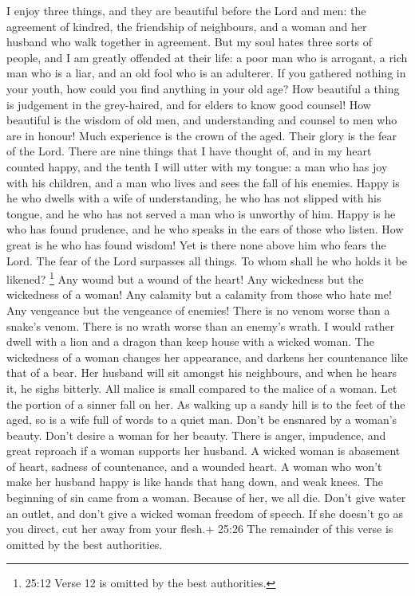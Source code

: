  I enjoy three things, and they are beautiful before the
Lord and men: the agreement of kindred, the friendship of neighbours,
and a woman and her husband who walk together in agreement. 
But my soul hates three sorts of people, and I am greatly offended at
their life: a poor man who is arrogant, a rich man who is a liar, and an
old fool who is an adulterer.  If you gathered nothing in
your youth, how could you find anything in your old age? 
How beautiful a thing is judgement in the grey-haired, and for elders to
know good counsel!  How beautiful is the wisdom of old men,
and understanding and counsel to men who are in honour! 
Much experience is the crown of the aged. Their glory is the fear of the
Lord.  There are nine things that I have thought of, and in
my heart counted happy, and the tenth I will utter with my tongue: a man
who has joy with his children, and a man who lives and sees the fall of
his enemies.  Happy is he who dwells with a wife of
understanding, he who has not slipped with his tongue, and he who has
not served a man who is unworthy of him.  Happy is he who
has found prudence, and he who speaks in the ears of those who listen.
 How great is he who has found wisdom! Yet is there none
above him who fears the Lord.  The fear of the Lord
surpasses all things. To whom shall he who holds it be likened?
 \footnote{25:12 Verse 12 is omitted by the best
  authorities.}  Any wound but a wound of the heart! Any
wickedness but the wickedness of a woman!  Any calamity but
a calamity from those who hate me! Any vengeance but the vengeance of
enemies!  There is no venom worse than a snake's venom.
There is no wrath worse than an enemy's wrath.  I would
rather dwell with a lion and a dragon than keep house with a wicked
woman.  The wickedness of a woman changes her appearance,
and darkens her countenance like that of a bear.  Her
husband will sit amongst his neighbours, and when he hears it, he sighs
bitterly.  All malice is small compared to the malice of a
woman. Let the portion of a sinner fall on her.  As walking
up a sandy hill is to the feet of the aged, so is a wife full of words
to a quiet man.  Don't be ensnared by a woman's beauty.
Don't desire a woman for her beauty.  There is anger,
impudence, and great reproach if a woman supports her husband.
 A wicked woman is abasement of heart, sadness of
countenance, and a wounded heart. A woman who won't make her husband
happy is like hands that hang down, and weak knees.  The
beginning of sin came from a woman. Because of her, we all die.
 Don't give water an outlet, and don't give a wicked woman
freedom of speech.  If she doesn't go as you direct, cut
her away from your flesh.+ 25:26 The remainder of this verse is omitted
by the best authorities.

